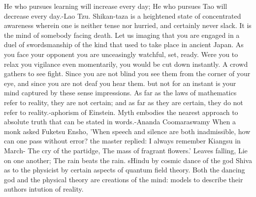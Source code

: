 He who pursues learning will increase every day; He who pursues Tao will decrease every day.-Lao Tzu.
Shikan-taza is a heightened state of concentrated awareness wherein one is neither tense nor hurried, and certainly never slack. It is the mind of somebody facing death. Let us imaging that you are engaged in a duel of swordsmanship of the kind that used to take place in ancient Japan. As you face your opponent you are unceasingly watchful, set, ready. Were you to relax you vigilance even momentarily, you would be cut down instantly. A crowd gathers to see fight. Since you are not blind you see them from the corner of your eye, and since you are not deaf you hear them. but not for an instant is your mind captured by these sense impressions.
As far as the laws of mathematics refer to reality, they are not certain; and as far as they are certain, they do not refer to reality.-aphorism of Einstein.
Myth embodies the nearest approach to absolute truth that can be stated in words.-Ananda Coomaraswamy
When a monk asked Fuketsu Ensho, 'When speech and silence are both inadmissible, how can one pass without error? the master replied: I always remember Kiangsu in March- The cry of the partidge, The mass of fragrant flowers.'
Leaves falling, Lie on one another; The rain beats the rain.
sHindu by cosmic dance of the god Shiva as to the physicist by certain aspects of quantum field theory. Both the dancing god and the physical theory are creations of the mind: models to describe their authors intution of reality.
